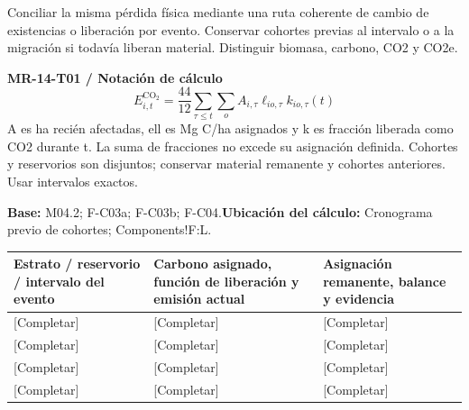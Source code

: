 Conciliar la misma pérdida física mediante una ruta coherente de cambio de existencias o liberación por evento. Conservar cohortes previas al intervalo o a la migración si todavía liberan material. Distinguir biomasa, carbono, CO2 y CO2e.\par
{}
\par\begingroup\sffamily\fontsize{8.4}{10.5}\selectfont\color{NEBGreen}
\textbf{MR-14-T01 / Notación de cálculo}\
{\fontsize{10}{12}\selectfont\[E^{\mathrm{CO_2}}_{i,t}=\frac{44}{12}\sum_{\tau\le t}\sum_o A_{i,\tau}\ell_{io,\tau}k_{io,\tau}(t)\]}
A es ha recién afectadas, ell es Mg C/ha asignados y k es fracción liberada como CO2 durante t. La suma de fracciones no excede su asignación definida. Cohortes y reservorios son disjuntos; conservar material remanente y cohortes anteriores. Usar intervalos exactos.\par
\textbf{Base:} M04.2; F-C03a; F-C03b; F-C04.\quad\textbf{Ubicación del cálculo:} Cronograma previo de cohortes; Components!F:L.\par\endgroup
{\sffamily\fontsize{8.6}{10.7}\selectfont\begin{longtable}{@{}P{48mm}P{61mm}P{53mm}@{}}
\toprule
\textbf{Estrato / reservorio / intervalo del evento} & \textbf{Carbono asignado, función de liberación y emisión actual} & \textbf{Asignación remanente, balance y evidencia}\\\midrule\endhead
\rule{0pt}{8mm}[Completar] & [Completar] & [Completar]\\\hline
\rule{0pt}{8mm}[Completar] & [Completar] & [Completar]\\\hline
\rule{0pt}{8mm}[Completar] & [Completar] & [Completar]\\\hline
\rule{0pt}{8mm}[Completar] & [Completar] & [Completar]\\\hline
\end{longtable}}
